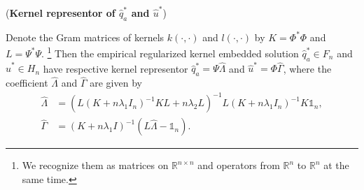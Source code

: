 \begin{proposition}(\textbf{Kernel representor of $\widehat{q}_a^*$ and $\widehat{u}^*$})
    
    \label{prop: est_kernelrepresentor}
    Denote the Gram matrices of kernels $k(\cdot,\cdot)$ and $l(\cdot,\cdot)$ by $K=\Phi^*\Phi$ and $L=\Psi^*\Psi$. \footnote{We recognize them as matrices on $\mathbb{R}^{n\times n}$ and operators from $\mathbb{R}^n$ to $\mathbb{R}^n$ at the same time.}
    Then the empirical regularized kernel embedded solution $\widehat{q}_a^*\in F_n$ and $\widehat{u}^*\in H_n$ have respective kernel representor $\widehat{q}_a^*=\Psi\widehat{\Lambda}$ and $\widehat{u}^*=\Phi\widehat{\Gamma}$, 
    where the coefficient $\widehat{\Lambda}$ and $\widehat{\Gamma}$ are given by 
    \begin{align}
        \label{eq: est_kernelrepresentor_exact}
        \widehat{\Lambda} &= (L(K+n\lambda_1I_n)^{-1}KL+n\lambda_2L)^{-1}L(K+n\lambda_1I_n)^{-1}K\mathds{1}_n, \\
        \widehat{\Gamma} &= (K+n\lambda_1I)^{-1}(L\widehat{\Lambda}-\mathds{1}_n).
    \end{align}
\end{proposition}
